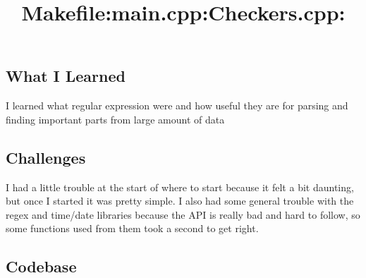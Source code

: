 \subsection{What I Learned}\label{sec:ps7:learned} %

I learned what regular expression were and how useful they are for parsing and finding important parts from large amount of data

\subsection{Challenges}\label{sec:ps7:challenges} %

I had a little trouble at the start of where to start because it felt a bit daunting, but once I started it was pretty simple.
I also had some general trouble with the regex and time/date libraries because the API is really bad and hard to follow,
so some functions used from them took a second to get right.

\newpage
\subsection{Codebase}\label{sec:ps7:code} %

\bigskip
\title{\large Makefile:}

\bigskip
\title{\large main.cpp:}

\bigskip
\title{\large Checkers.cpp:}


\newpage
